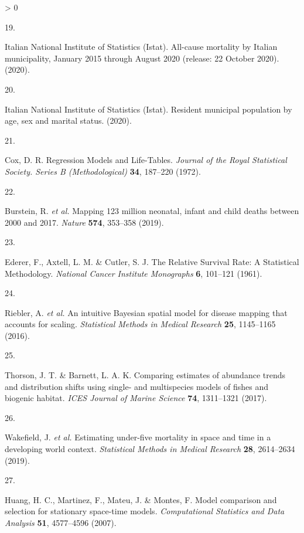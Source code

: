 \documentclass[
]{article}
\newlength{\cslhangindent}
\newlength{\csllabelwidth}
\newenvironment{CSLReferences}[2] %
 {%
  \setlength{\parindent}{0pt}
  \ifodd #1 \everypar{\setlength{\hangindent}{\cslhangindent}}\ignorespaces\fi
  \ifnum #2 > 0
  \setlength{\parskip}{#2\baselineskip}
  \fi
 }%
 {}
\newcommand{\CSLLeftMargin}[1]{\parbox[t]{\csllabelwidth}{#1}}
\newcommand{\CSLRightInline}[1]{\parbox[t]{\linewidth - \csllabelwidth}{#1}\break}
\begin{document}
\begin{CSLReferences}{0}{0}
\leavevmode\hypertarget{ref-ItalianNationalInstituteofStatisticsIstat2020a}{}%
\CSLLeftMargin{19. }
\CSLRightInline{Italian National Institute of Statistics (Istat). {All-cause mortality by Italian municipality, January 2015 through August 2020 (release: 22 October 2020).} (2020).}

\leavevmode\hypertarget{ref-ItalianNationalInstituteofStatisticsIstat2020}{}%
\CSLLeftMargin{20. }
\CSLRightInline{Italian National Institute of Statistics (Istat). {Resident municipal population by age, sex and marital status}. (2020).}

\leavevmode\hypertarget{ref-Cox1972}{}%
\CSLLeftMargin{21. }
\CSLRightInline{Cox, D. R. {Regression Models and Life-Tables}. \emph{Journal of the Royal Statistical Society. Series B (Methodological)} \textbf{34}, 187--220 (1972).}

\leavevmode\hypertarget{ref-Burstein2019}{}%
\CSLLeftMargin{22. }
\CSLRightInline{Burstein, R. \emph{et al.} {Mapping 123 million neonatal, infant and child deaths between 2000 and 2017}. \emph{Nature} \textbf{574}, 353--358 (2019).}

\leavevmode\hypertarget{ref-Ederer1961}{}%
\CSLLeftMargin{23. }
\CSLRightInline{Ederer, F., Axtell, L. M. \& Cutler, S. J. {The Relative Survival Rate: A Statistical Methodology}. \emph{National Cancer Institute Monographs} \textbf{6}, 101--121 (1961).}

\leavevmode\hypertarget{ref-Riebler2016}{}%
\CSLLeftMargin{24. }
\CSLRightInline{Riebler, A. \emph{et al.} {An intuitive Bayesian spatial model for disease mapping that accounts for scaling}. \emph{Statistical Methods in Medical Research} \textbf{25}, 1145--1165 (2016).}

\leavevmode\hypertarget{ref-Thorson2017}{}%
\CSLLeftMargin{25. }
\CSLRightInline{Thorson, J. T. \& Barnett, L. A. K. {Comparing estimates of abundance trends and distribution shifts using single- and multispecies models of fishes and biogenic habitat}. \emph{ICES Journal of Marine Science} \textbf{74}, 1311--1321 (2017).}

\leavevmode\hypertarget{ref-Wakefield2019}{}%
\CSLLeftMargin{26. }
\CSLRightInline{Wakefield, J. \emph{et al.} {Estimating under-five mortality in space and time in a developing world context}. \emph{Statistical Methods in Medical Research} \textbf{28}, 2614--2634 (2019).}

\leavevmode\hypertarget{ref-Huang2007}{}%
\CSLLeftMargin{27. }
\CSLRightInline{Huang, H. C., Martinez, F., Mateu, J. \& Montes, F. {Model comparison and selection for stationary space-time models}. \emph{Computational Statistics and Data Analysis} \textbf{51}, 4577--4596 (2007).}


\end{CSLReferences}
\end{document}
